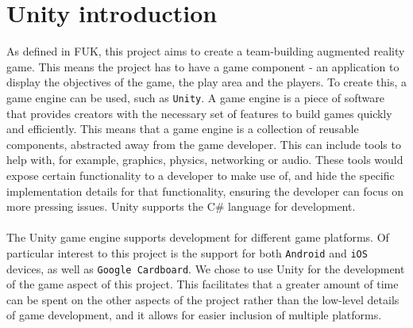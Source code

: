\section{Unity introduction}
As defined in FUK, this project aims to create a team-building augmented reality game.
This means the project has to have a game component - an application to display the objectives of the game, the play area and the players.
To create this, a game engine can be used, such as \texttt{Unity}.
A game engine is a piece of software that provides creators with the necessary set of features to build games quickly and efficiently\cite{gameengine}.
This means that a game engine is a collection of reusable components, abstracted away from the game developer.
This can include tools to help with, for example, graphics, physics, networking or audio.
These tools would expose certain functionality to a developer to make use of, and hide the specific implementation details for that functionality, ensuring the developer can focus on more pressing issues.
Unity supports the C\# language for development\cite{unitylanguage}.
\\\\
The Unity game engine supports development for different game platforms.
Of particular interest to this project is the support for both \texttt{Android} and \texttt{iOS} devices, as well as \texttt{Google Cardboard}\cite{unityplatforms}.
We chose to use Unity for the development of the game aspect of this project.
This facilitates that a greater amount of time can be spent on the other aspects of the project rather than the low-level details of game development, and it allows for easier inclusion of multiple platforms.